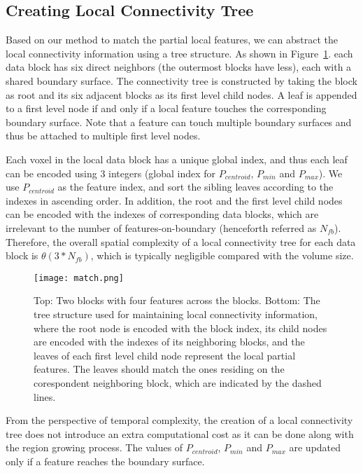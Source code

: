 \subsection{Creating Local Connectivity Tree}

Based on our method to match the partial local features, we can abstract the local connectivity information using a tree structure. As shown in Figure~\ref{fig:match}. each data block has six direct neighbors (the outermost blocks have less), each with a shared boundary surface. The connectivity tree is constructed by taking the block as root and its six adjacent blocks as its first level child nodes. A leaf is appended to a first level node if and only if a local feature touches the corresponding boundary surface. Note that a feature can touch multiple boundary surfaces and thus be attached to multiple first level nodes.

Each voxel in the local data block has a unique global index, and thus each leaf can be encoded using 3 integers (global index for $P_{centroid}$, $P_{min}$ and $P_{max}$). We use $P_{centroid}$ as the feature index, and sort the sibling leaves according to the indexes in ascending order. In addition, the root and the first level child nodes can be encoded with the indexes of corresponding data blocks, which are irrelevant to the number of features-on-boundary (henceforth referred as $N_{fb}$). Therefore, the overall spatial complexity of a local connectivity tree for each data block is $\theta(3*N_{fb})$, which is typically negligible compared with the volume size. 

\begin{figure}[t]
	\centering
	\texttt{[image: match.png]}
	\caption{Top: Two blocks with four features across the blocks. Bottom: The tree structure used for maintaining local connectivity information, where the root node is encoded with the block index, its child nodes are encoded with the indexes of its neighboring blocks, and the leaves of each first level child node represent the local partial features. The leaves should match the ones residing on the corespondent neighboring block, which are indicated by the dashed lines.}
	\label{fig:match}
\end{figure}

From the perspective of temporal complexity, the creation of a local connectivity tree does not introduce an extra computational cost as it can be done along with the region growing process. The values of $P_{centroid}$, $P_{min}$ and $P_{max}$ are updated only if a feature reaches the boundary surface.

